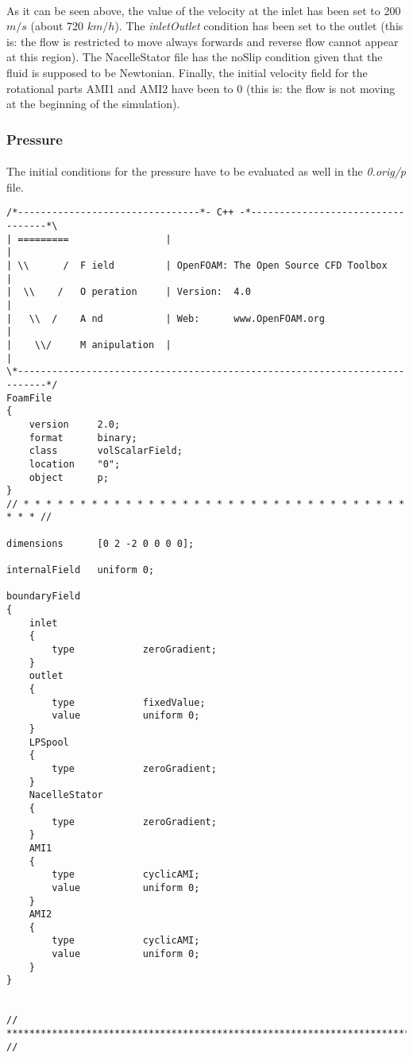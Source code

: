 \paragraph{}As it can be seen above, the value of the velocity at the inlet has been set to 200 $m/s$ (about 720 $km/h$). The \textit{inletOutlet} condition has been set to the outlet (this is: the flow is restricted to move always forwards and reverse flow cannot appear at this region). The NacelleStator file has the noSlip condition given that the fluid is supposed to be Newtonian. Finally, the initial velocity field for the rotational parts AMI1 and AMI2 have been to 0 (this is: the flow is not moving at the beginning of the simulation).

\subsubsection{Pressure}

\paragraph{}The initial conditions for the pressure have to be evaluated as well in the \textit{0.orig/p} file.

\begin{footnotesize}
\begin{verbatim}
/*--------------------------------*- C++ -*----------------------------------*\
| =========                 |                                                 |
| \\      /  F ield         | OpenFOAM: The Open Source CFD Toolbox           |
|  \\    /   O peration     | Version:  4.0                                   |
|   \\  /    A nd           | Web:      www.OpenFOAM.org                      |
|    \\/     M anipulation  |                                                 |
\*---------------------------------------------------------------------------*/
FoamFile
{
    version     2.0;
    format      binary;
    class       volScalarField;
    location    "0";
    object      p;
}
// * * * * * * * * * * * * * * * * * * * * * * * * * * * * * * * * * * * * * //

dimensions      [0 2 -2 0 0 0 0];

internalField   uniform 0;

boundaryField
{
    inlet
    {
        type            zeroGradient;
    }
    outlet
    {
        type            fixedValue;
        value           uniform 0;
    }
    LPSpool
    {
        type            zeroGradient;
    }
    NacelleStator
    {
        type            zeroGradient;
    }
    AMI1
    {
        type            cyclicAMI;
        value           uniform 0;
    }
    AMI2
    {
        type            cyclicAMI;
        value           uniform 0;
    }
}


// ************************************************************************* //
\end{verbatim}
\end{footnotesize}

